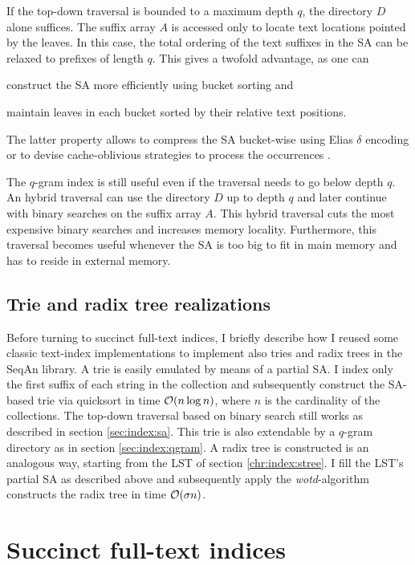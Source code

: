 If the top-down traversal is bounded to a maximum depth $q$, the directory $D$ alone suffices.
The suffix array $A$ is accessed only to locate text locations pointed by the leaves.
In this case, the total ordering of the text suffixes in the SA can be relaxed to prefixes of length $q$.
This gives a twofold advantage, as one can
\begin{inparaenum}[(i)]
\item construct the SA more efficiently using bucket sorting and
\item maintain leaves in each bucket sorted by their relative text positions.
\end{inparaenum}
The latter property allows to compress the SA bucket-wise \eg using Elias $\delta$ encoding \citep{Elias1975} or to devise cache-oblivious strategies to process the occurrences \citep{Hach2010}.

The $q$-gram index is still useful even if the traversal needs to go below depth $q$.
An hybrid traversal can use the directory $D$ up to depth $q$ and later continue with binary searches on the suffix array $A$.
This hybrid traversal cuts the most expensive binary searches and increases memory locality.
Furthermore, this traversal becomes useful whenever the SA is too big to fit in main memory and has to reside in external memory.

\subsection{Trie and radix tree realizations}
\label{sec:index:trie}

Before turning to succinct full-text indices, I briefly describe how I reused some classic text-index implementations to implement also tries and radix trees in the SeqAn library.
A trie is easily emulated by means of a partial SA.
I index only the first suffix of each string in the collection and subsequently construct the SA-based trie via quicksort in time $\mathcal{O}(n \log n)$, where $n$ is the cardinality of the collections.
The top-down traversal based on binary search still works as described in section \ref{sec:index:sa}.
This trie is also extendable by a $q$-gram directory as in section \ref{sec:index:qgram}.
A radix tree is constructed is an analogous way, starting from the LST of section \ref{chr:index:stree}.
I fill the LST's partial SA as described above and subsequently apply the \emph{wotd}-algorithm \citep{Giegerich1999} constructs the radix tree in time $\mathcal{O}(\sigma n)$.


\section{Succinct full-text indices}

